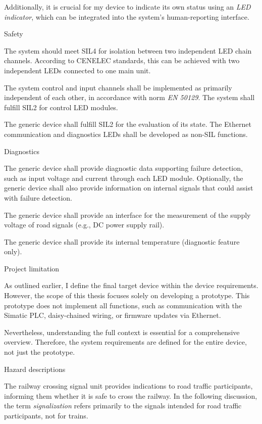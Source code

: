Additionally, it is crucial for my device to indicate its own status using an {\it LED indicator}, which can be integrated into the system’s human-reporting interface.

\secc Safety

The system should meet SIL4 for isolation between two independent LED chain channels. According to CENELEC standards, this can be achieved with two independent LEDs connected to one main unit.

The system control and input channels shall be implemented as primarily independent of each other, in accordance with norm {\it EN 50129}. The system shall fulfill SIL2 for control LED modules.

The generic device shall fulfill SIL2 for the evaluation of its state. The Ethernet communication and diagnostics LEDs shall be developed as non-SIL functions.

\secc Diagnostics

The generic device shall provide diagnostic data supporting failure detection, such as input voltage and current through each LED module. Optionally, the generic device shall also provide information on internal signals that could assist with failure detection.

The generic device shall provide an interface for the measurement of the supply voltage of road signals (e.g., DC power supply rail).

The generic device shall provide its internal temperature (diagnostic feature only).

\secc Project limitation

As outlined earlier, I define the final target device within the device requirements. However, the scope of this thesis focuses solely on developing a prototype. This prototype does not implement all functions, such as communication with the Simatic PLC, daisy-chained wiring, or firmware updates via Ethernet.

Nevertheless, understanding the full context is essential for a comprehensive overview. Therefore, the system requirements are defined for the entire device, not just the prototype.

\sec Hazard descriptions

The railway crossing signal unit provides indications to road traffic participants, informing them whether it is safe to cross the railway. In the following discussion, the term {\it signalization} refers primarily to the signals intended for road traffic participants, not for trains.

